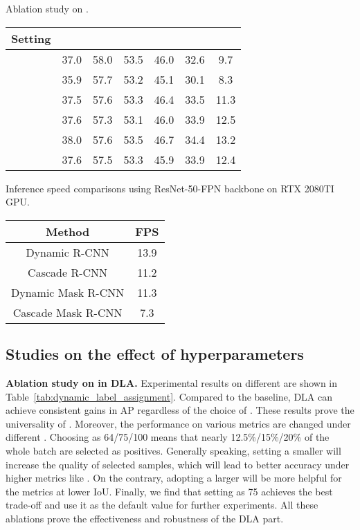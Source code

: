 \documentclass[runningheads]{llncs}
\begin{document}
\noindent
\begin{minipage}[!t]{\textwidth}
    \begin{minipage}{0.56\textwidth}
    \centering
        \makeatletter{}\makeatother\caption{Ablation study on .}
        \setlength{\tabcolsep}{1pt}
        \begin{tabular}{ccccccc}
        \toprule
        Setting &  &  &  &  &  & \\
        \midrule
         & 37.0 & 58.0 & 53.5 & 46.0 & 32.6 & 9.7\\
         & 35.9 & 57.7 & 53.2 & 45.1 & 30.1 & 8.3\\
         & 37.5 & 57.6 & 53.3 & 46.4 & 33.5 & 11.3\\
        \midrule
         & 37.6 & 57.3 & 53.1 & 46.0 & 33.9 & 12.5\\
         & 38.0 & 57.6 & 53.5 & 46.7 & 34.4 & 13.2\\
         & 37.6 & 57.5 & 53.3 & 45.9 & 33.9 & 12.4\\
        \bottomrule
        \end{tabular}
        \label{tab:dynamic_smoothL1}
    \end{minipage}
    \begin{minipage}{0.42\textwidth}
    \centering
        \makeatletter{}\makeatother\caption{Inference speed comparisons using ResNet-50-FPN backbone on RTX 2080TI GPU.}
        \setlength{\tabcolsep}{1pt}
        \begin{tabular}{cc}
        \toprule
        Method & FPS\\
        \midrule
        Dynamic R-CNN & 13.9\\
        Cascade R-CNN & 11.2\\
        Dynamic Mask R-CNN & 11.3\\
        Cascade Mask R-CNN & 7.3\\
        \bottomrule
        \end{tabular}
        \label{tab:speed}
    \end{minipage}
\end{minipage}


\subsection{Studies on the effect of hyperparameters}


\textbf{Ablation study on  in DLA.}
Experimental results on different  are shown in Table~\ref{tab:dynamic_label_assignment}. Compared to the baseline, DLA can achieve consistent gains in AP regardless of the choice of . These results prove the universality of . Moreover, the performance on various metrics are changed under different . Choosing  as 64/75/100 means that nearly 12.5\%/15\%/20\% of the whole batch are selected as positives. Generally speaking, setting a smaller  will increase the quality of selected samples, which will lead to better accuracy under higher metrics like . On the contrary, adopting a larger  will be more helpful for the metrics at lower IoU. Finally, we find that setting  as 75 achieves the best trade-off and use it as the default value for further experiments. All these ablations prove the effectiveness and robustness of the DLA part.
\end{document}
